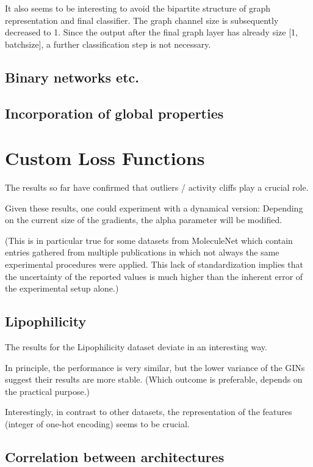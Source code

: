 It also seems to be interesting to avoid the bipartite structure of graph representation and final classifier.
The graph channel size is subsequently decreased to 1. Since the output after the final graph layer has already size [1, batchsize], a further classification step is not necessary.

\subsection{Binary networks etc.}

\subsection{Incorporation of global properties}

\section{Custom Loss Functions}

The results so far have confirmed that outliers / activity cliffs play a crucial role.

Given these results, one could experiment with a dynamical version: Depending on the current size of the gradients, the alpha parameter will be modified.

(This is in particular true for some datasets from MoleculeNet which contain entries gathered from multiple publications in which not always the same experimental procedures were applied. This lack of standardization implies that the uncertainty of the reported values is much higher than the inherent error of the experimental setup alone.)


\subsection{Lipophilicity}

The results for the Lipophilicity dataset deviate in an interesting way.

In principle, the performance is very similar, but the lower variance of the GINs suggest their results are more stable. (Which outcome is preferable, depends on the practical purpose.)

Interestingly, in contrast to other datasets, the representation of the features (integer of one-hot encoding) seems to be crucial.

\subsection{Correlation between architectures}

